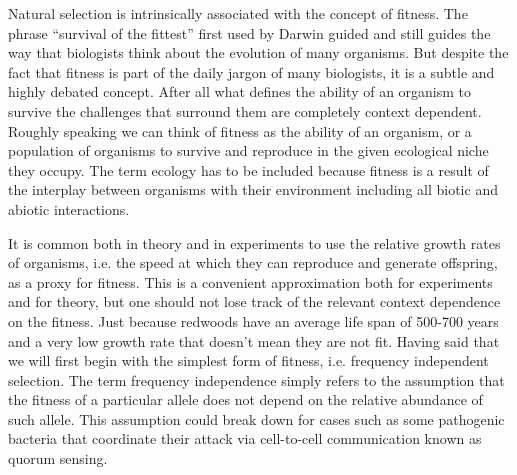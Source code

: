 Natural selection is intrinsically associated with the concept of fitness. The
phrase ``survival of the fittest'' first used by Darwin guided and still guides
the way that biologists think about the evolution of many organisms. But
despite the fact that fitness is part of the daily jargon of many biologists,
it is a subtle and highly debated concept. After all what defines the ability
of an organism to survive the challenges that surround them are completely
context dependent. Roughly speaking we can think of fitness as the ability of
an organism, or a population of organisms to survive and reproduce in the given
ecological niche they occupy. The term ecology has to be included because
fitness is a result of the interplay between organisms with their environment
including all biotic and abiotic interactions. 

It is common both in theory and in experiments to use the relative growth rates
of organisms, i.e. the speed at which they can reproduce and generate
offspring, as a proxy for fitness. This is a convenient approximation both
for experiments and for theory, but one should not lose track of the relevant
context dependence on the fitness. Just because redwoods have an average life
span of 500-700 years and a very low growth rate that doesn't mean they are not
fit. Having said that we will first begin with the simplest form of fitness,
i.e. frequency independent selection. The term frequency independence simply
refers to the assumption that the fitness of a particular allele does not
depend on the relative abundance of such allele. This assumption could break
down for cases such as some pathogenic bacteria that coordinate their attack
via cell-to-cell communication known as quorum sensing. 

